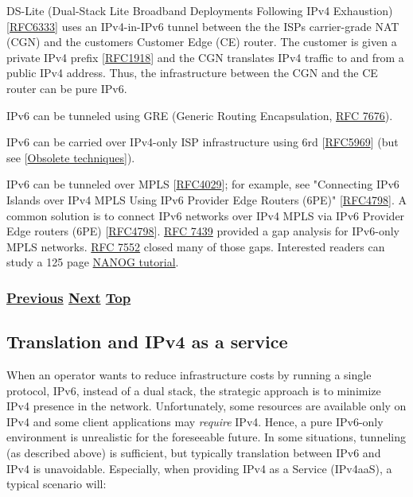 \documentclass[
]{article}
\begin{document}
DS-Lite (Dual-Stack Lite Broadband Deployments Following IPv4
Exhaustion)
{[}\href{https://www.rfc-editor.org/info/rfc6333}{RFC6333}{]} uses an
IPv4-in-IPv6 tunnel between the the ISP\textquotesingle s carrier-grade
NAT (CGN) and the customer\textquotesingle s Customer Edge (CE) router.
The customer is given a private IPv4 prefix
{[}\href{https://www.rfc-editor.org/info/rfc1918}{RFC1918}{]} and the
CGN translates IPv4 traffic to and from a public IPv4 address. Thus, the
infrastructure between the CGN and the CE router can be pure IPv6.

IPv6 can be tunneled using GRE (Generic Routing Encapsulation,
\href{https://www.rfc-editor.org/info/rfc7676}{RFC 7676}).

IPv6 can be carried over IPv4-only ISP infrastructure using 6rd
{[}\href{https://www.rfc-editor.org/info/rfc5969}{RFC5969}{]} (but see
{[}\hyperref[obsolete-techniques]{Obsolete techniques}{]}).

IPv6 can be tunneled over MPLS
{[}\href{https://www.rfc-editor.org/info/rfc4029}{RFC4029}{]}; for
example, see "Connecting IPv6 Islands over IPv4 MPLS Using IPv6 Provider
Edge Routers (6PE)"
{[}\href{https://www.rfc-editor.org/info/rfc4798}{RFC4798}{]}. A common
solution is to connect IPv6 networks over IPv4 MPLS via IPv6 Provider
Edge routers (6PE)
{[}\href{https://www.rfc-editor.org/info/rfc4798}{RFC4798}{]}.
\href{https://www.rfc-editor.org/info/rfc7439}{RFC 7439} provided a gap
analysis for IPv6-only MPLS networks.
\href{https://www.rfc-editor.org/info/rfc7552}{RFC 7552} closed many of
those gaps. Interested readers can study a 125 page
\href{https://pc.nanog.org/static/published/meetings/NANOG76/1993/20190612_Agahian_Demystifying_Ipv6_Over_v1.pdf}{NANOG
tutorial}.

\subsubsection{\texorpdfstring{\hyperref[dual-stack-scenarios]{Previous}
\hyperref[translation-and-ipv4-as-a-service]{Next}
\hyperref[coexistence-with-legacy-ipv4]{Top}}{Previous Next Top}}\label{previous-next-top-19}

\pagebreak

\subsection{Translation and IPv4 as a
service}\label{translation-and-ipv4-as-a-service}

When an operator wants to reduce infrastructure costs by running a
single protocol, IPv6, instead of a dual stack, the strategic approach
is to minimize IPv4 presence in the network. Unfortunately, some
resources are available only on IPv4 and some client applications may
\emph{require} IPv4. Hence, a pure IPv6-only environment is unrealistic
for the foreseeable future. In some situations, tunneling (as described
above) is sufficient, but typically translation between IPv6 and IPv4 is
unavoidable. Especially, when providing IPv4 as a Service (IPv4aaS), a
typical scenario will:
\end{document}
